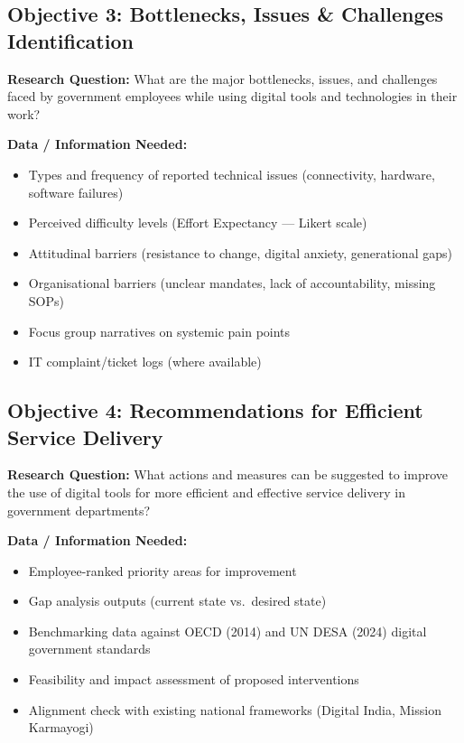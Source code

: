 \documentclass[12pt,a4paper]{article}
\begin{document}
\subsection{Objective 3: Bottlenecks, Issues \& Challenges Identification}

\textbf{\color{accentorange}Research Question:} What are the major bottlenecks, issues, and challenges faced by government employees while using digital tools and technologies in their work?

\textbf{Data / Information Needed:}
\begin{itemize}[leftmargin=1.5em, itemsep=2pt]
    \item Types and frequency of reported technical issues (connectivity, hardware, software failures)
    \item Perceived difficulty levels (Effort Expectancy --- Likert scale)
    \item Attitudinal barriers (resistance to change, digital anxiety, generational gaps)
    \item Organisational barriers (unclear mandates, lack of accountability, missing SOPs)
    \item Focus group narratives on systemic pain points
    \item IT complaint/ticket logs (where available)
\end{itemize}

\subsection{Objective 4: Recommendations for Efficient Service Delivery}

\textbf{\color{accentpurple}Research Question:} What actions and measures can be suggested to improve the use of digital tools for more efficient and effective service delivery in government departments?

\textbf{Data / Information Needed:}
\begin{itemize}[leftmargin=1.5em, itemsep=2pt]
    \item Employee-ranked priority areas for improvement
    \item Gap analysis outputs (current state vs.\ desired state)
    \item Benchmarking data against OECD (2014) and UN DESA (2024) digital government standards
    \item Feasibility and impact assessment of proposed interventions
    \item Alignment check with existing national frameworks (Digital India, Mission Karmayogi)
\end{itemize}
\end{document}
